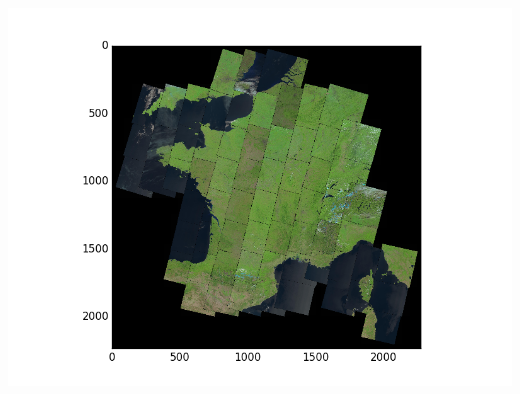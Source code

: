 \documentclass[c]{beamer}
\begin{document}
\begin{frame}
\begin{columns}[t]
\begin{column}{0.50\textwidth}
\begin{overlayarea}{\linewidth}{4cm}
  \centering\vfill
  \includegraphics[scale=0.25]{images/importing/france-covering.png}
\end{overlayarea}
\end{column}
\end{columns}

\end{frame}
\end{document}
